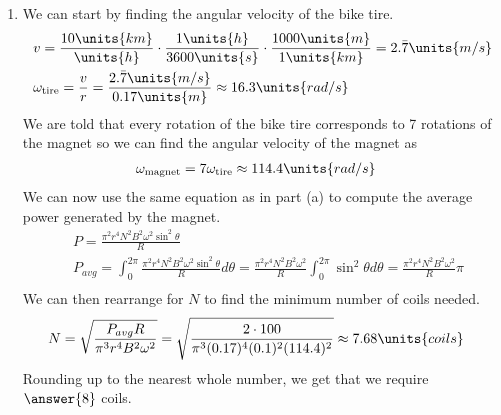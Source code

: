 {\begin{enumerate}
    \item We can start by finding the angular velocity of the bike tire.
    \begin{align*}
        &v=\frac{10\units{km}}{\units{h}}\cdot\frac{1\units{h}}{3600\units{s}}\cdot\frac{1000\units{m}}{1\units{km}}=2.\bar{7}\units{m/s}\\
        &\omega_\text{tire}=\frac{v}{r}=\frac{2.\bar{7}\units{m/s}}{0.17\units{m}}\approx16.3\units{rad/s}
    \end{align*}
    We are told that every rotation of the bike tire corresponds to 7 rotations of the magnet so we can find the angular velocity of the magnet as
    \begin{align*}
        &\omega_\text{magnet}=7\omega_\text{tire}\approx114.4\units{rad/s}
    \end{align*}
    We can now use the same equation as in part (a) to compute the average power generated by the magnet.
    \begin{align*}
        &P=\frac{\pi^2r^4N^2B^2\omega^2\sin^2\theta}{R}\\
        &P_{avg}=\int_0^{2\pi}\frac{\pi^2r^4N^2B^2\omega^2\sin^2\theta}{R}d\theta=\frac{\pi^2r^4N^2B^2\omega^2}{R}\int_0^{2\pi}\sin^2\theta d\theta=\frac{\pi^2r^4N^2B^2\omega^2}{R}\pi\\
    \end{align*}
    We can then rearrange for $N$ to find the minimum number of coils needed.
    \begin{align*}
        &N=\sqrt{\frac{P_{avg}R}{\pi^3r^4B^2\omega^2}}=\sqrt{\frac{2\cdot100}{\pi^3(0.17)^4(0.1)^2(114.4)^2}}\approx7.68\units{coils}
    \end{align*}
    Rounding up to the nearest whole number, we get that we require $\answer{8}$ coils.
\end{enumerate}

}{}